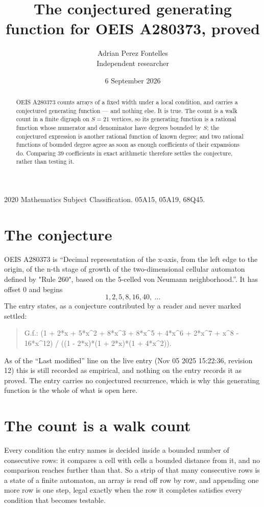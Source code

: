 \documentclass[11pt,a4paper]{article}
\title{The conjectured generating function for OEIS A280373, proved}
\author{Adrian Perez Fontelles\\ \small Independent researcher}
\date{6 September 2026}
\theoremstyle{plain}
\theoremstyle{definition}
\begin{document}
\maketitle

\begin{abstract}
OEIS A280373 counts arrays of a fixed width under a local condition, and carries a conjectured
generating function --- and nothing else. It is true. The count is a walk count in a finite
digraph on $S=21$ vertices, so its generating function is a rational function whose numerator
and denominator have degrees bounded by $S$; the conjectured expression is another rational
function of known degree; and two rational functions of bounded degree agree as soon as enough
coefficients of their expansions do. Comparing $39$ coefficients in exact arithmetic
therefore settles the conjecture, rather than testing it.
\end{abstract}

\noindent\small 2020 Mathematics Subject Classification. 05A15, 05A19, 68Q45.\normalsize

\section{The conjecture}

OEIS A280373 is ``Decimal representation of the x-axis, from the left edge to the origin, of the n-th stage of growth of the two-dimensional cellular automaton defined by "Rule 260", based on the 5-celled von Neumann neighborhood.''. It has offset $0$ and begins
\[
1, 2, 5, 8, 16, 40,\ \dots
\]
The entry states, as a conjecture contributed by a reader and never marked settled:
\begin{quote}
G.f.: (1 + 2*x + 5*x\^{}2 + 8*x\^{}3 + 8*x\^{}5 + 4*x\^{}6 + 2*x\^{}7 + x\^{}8 - 16*x\^{}12) / ((1 - 2*x)*(1 + 2*x)*(1 + 4*x\^{}2)).
\end{quote}
As of the ``Last modified'' line on the live entry (Nov 05 2025 15:22:36, revision 12) this is still
recorded as empirical, and nothing on the entry records it as proved. The entry carries no
conjectured recurrence, which is why this generating function is the whole of what is open
here.

\section{The count is a walk count}

Every condition the entry names is decided inside a bounded number of consecutive rows: it
compares a cell with cells a bounded distance from it, and no comparison reaches further than
that. So a strip of that many consecutive rows is a state of a finite automaton, an array is
read off row by row, and appending one more row is one step, legal exactly when the row it
completes satisfies every condition that becomes testable.
\end{document}
